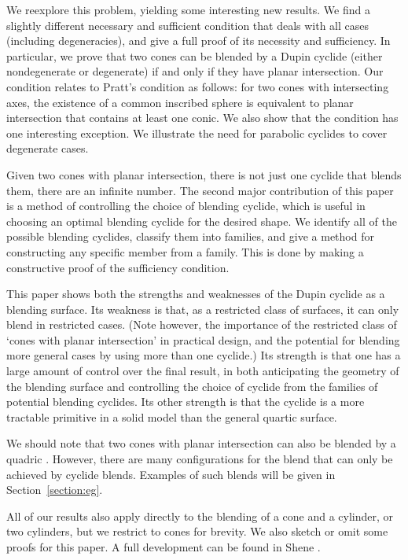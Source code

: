 We reexplore this problem, yielding some interesting new results.
We find a slightly different necessary and sufficient condition 
that deals with all cases (including degeneracies), 
and give a full proof of its necessity and sufficiency.
In particular, we prove that two cones can be blended by a Dupin cyclide
(either nondegenerate or degenerate)
if and only if they have planar intersection.
Our condition relates to Pratt's condition as follows:
for two cones with intersecting axes,
the existence of a common inscribed sphere
is equivalent to planar intersection that contains at least one conic.
We also show that the condition has one interesting exception.
We illustrate the need for parabolic cyclides to cover degenerate cases.

Given two cones with planar intersection, there is not just one cyclide
that blends them, there are an infinite number.
The second major contribution of this paper is a method of controlling
the choice of blending cyclide,
which is useful in choosing an optimal blending cyclide for the desired shape.
We identify all of the possible blending cyclides, classify them 
into families,
and give a method for constructing any specific member from a family.
This is done by making a constructive proof of the sufficiency condition.

This paper shows both the strengths and weaknesses of the Dupin cyclide as
a blending surface.
Its weakness is that, as a restricted class of surfaces, it can only blend
in restricted cases.
(Note however, the importance of the restricted class of `cones with planar
intersection' in practical design, and the potential for blending more general
cases by using more than one cyclide.)
Its strength is that one has a large amount of control over the final result,
in both anticipating the geometry of the blending surface and 
controlling the choice of cyclide from the families of potential blending
cyclides.
Its other strength is that the cyclide is a more tractable primitive in
a solid model than the general quartic surface.

We should note that two cones with planar intersection can also be blended by 
a quadric \cite{warren:1987}.
However, there are many configurations for the blend that can only be
achieved by cyclide blends.
Examples of such blends will be given in Section~\ref{section:eg}.

All of our results also apply directly 
to the blending of a cone and a cylinder, or two
cylinders, but we restrict to cones for brevity.
We also sketch or omit some proofs for this paper.
A full development can be found in Shene \cite{shenethesis}.


